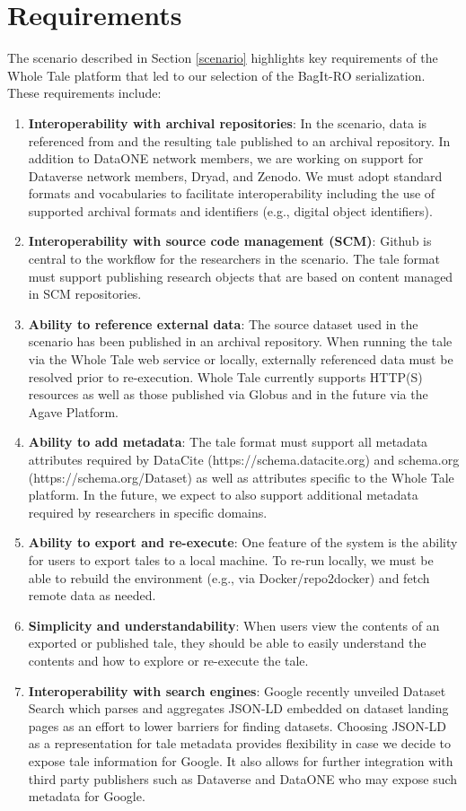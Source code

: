 \documentclass[conference]{IEEEtran}
\begin{document}
\section{Requirements}  \label{requirements}
The scenario described in Section \ref{scenario} highlights key requirements of the 
Whole Tale platform that led to our selection of the BagIt-RO serialization.  These requirements include:

\begin{enumerate}
\item{{\bf Interoperability with archival repositories}: In the
    scenario, data is referenced from and the resulting tale published
    to an archival repository. In addition to DataONE network members,
    we are working on support for Dataverse network members, Dryad, and
    Zenodo. We must adopt standard formats and vocabularies to
    facilitate interoperability including the use of supported
    archival formats and identifiers (e.g., digital object
		identifiers).} 
\item{{\bf Interoperability with source code management (SCM)}:  Github is central to the workflow for the researchers in the scenario. The tale format must support publishing research objects that are based on content managed in SCM repositories.}
\item{{\bf Ability to reference external data}: The source dataset used in the scenario has been published in an archival repository. When running the tale via the Whole Tale web service or locally, externally referenced data must be resolved prior to re-execution. Whole Tale currently supports HTTP(S) resources as well as those published via Globus and in the future via the Agave Platform.}
\item{{\bf Ability to add metadata}: The tale format must support all
	metadata attributes required by DataCite
		(https://schema.datacite.org) and schema.org (https://schema.org/Dataset) as well as
    attributes specific to the Whole Tale platform. 
 In the future, we expect to also support additional metadata required by researchers in specific domains.}
\item{{\bf Ability to export and re-execute}: One feature of the system is the ability for users to export tales to a local machine. To re-run locally, we must be able to rebuild the environment (e.g., via Docker/repo2docker) and fetch remote data as needed.}
\item{{\bf Simplicity and understandability}: When users view the contents of an exported or published tale, they should be able to easily understand the contents and how to explore or re-execute the tale.}
\item{{\bf Interoperability with search engines}: Google recently unveiled Dataset Search which parses and aggregates JSON-LD embedded on dataset landing pages as an effort to lower barriers for finding datasets. Choosing JSON-LD as a representation for tale metadata provides flexibility in case we decide to expose tale information for Google. It also allows for further integration with third party publishers such as Dataverse and DataONE who may expose such metadata for Google.}
\end{enumerate}
\end{document}
